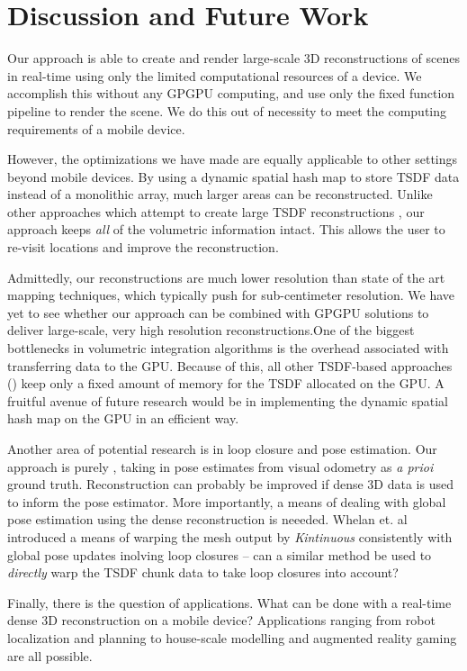 \documentclass[conference,10pt]{IEEEtran}
\begin{document}
\section{Discussion and Future Work}
Our approach is able to create and render large-scale 3D reconstructions of
scenes in real-time using only the limited computational resources of a
 device. We accomplish this without any GPGPU computing, and use
only the fixed function pipeline to render the scene. We do this out of
necessity to meet the computing requirements of a mobile device.

However, the optimizations we have made are equally applicable to other
settings beyond mobile devices. By using a dynamic spatial hash map to store
TSDF data instead of a monolithic array, much larger areas can be
reconstructed. Unlike other approaches which attempt to create large TSDF
reconstructions \cite{Whelan2013}, our approach keeps \textit{all} of the
volumetric information intact. This allows the user to re-visit locations and
improve the reconstruction.

Admittedly, our reconstructions are much lower resolution than state of the art
mapping techniques, which typically push for sub-centimeter resolution. We have
yet to see whether our approach can be combined with GPGPU solutions to deliver
large-scale, very high resolution reconstructions.One of the biggest
bottlenecks in volumetric integration algorithms is the overhead associated
with transferring data to the GPU. Because of this, all other TSDF-based
approaches (\cite{Newcombe, Whelan2013, Bylow2013, Nguyen2012}) keep only a
fixed amount of memory for the TSDF allocated on the GPU. A fruitful avenue of
future research would be in implementing the dynamic spatial hash map on the GPU
in an efficient way. 

Another area of potential research is in loop closure and pose estimation. Our
approach is purely , taking in pose estimates from visual
odometry as \textit{a prioi} ground truth. Reconstruction can probably be
improved if dense 3D data is used to inform the pose estimator. More
importantly, a means of dealing with global pose estimation using the dense
reconstruction is neeeded. Whelan et. al \cite{WhelanLoopClose} introduced a
means of warping the mesh output by \textit{Kintinuous} consistently with global
pose updates inolving loop closures -- can a similar method be used to
\textit{directly} warp the TSDF chunk data to take loop closures into account?

Finally, there is the question of applications. What can be done with a
real-time dense 3D reconstruction on a mobile device? Applications ranging from
robot localization and planning to house-scale modelling and augmented reality
gaming are all possible.
\end{document}

